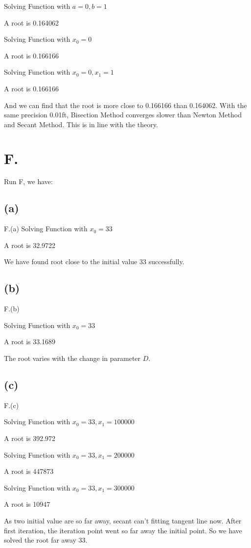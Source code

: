 \documentclass[a4paper]{article}
\begin{document}
Solving Function with $a=0, b=1$

A root is 0.164062

Solving Function with $x_0=0$

A root is 0.166166

Solving Function with $x_0=0, x_1=1$

A root is 0.166166


And we can find that the root is more close to 0.166166 than 0.164062. 
With the same precision 0.01ft, Bisection Method converges slower than Newton Method and Secant Method.
This is in line with the theory.

\section*{F.}
Run F, we have:

\subsection*{(a)}

F.(a)
Solving Function with $x_0=33$

A root is 32.9722

We have found root close to the initial value 33 successfully.

\subsection*{(b)}
F.(b)

Solving Function with $x_0=33$

A root is 33.1689

The root varies with the change in parameter $D$.

\subsection*{(c)}
F.(c)

Solving Function with $x_0=33, x_1=100000$

A root is 392.972

Solving Function with $x_0=33, x_1=200000$

A root is 447873

Solving Function with $x_0=33, x_1=300000$

A root is 10947


As two initial value are so far away, secant can't fitting tangent line now. 
After first iteration, the iteration point went so far away the initial point. 
So we have solved the root far away 33.
\end{document}
